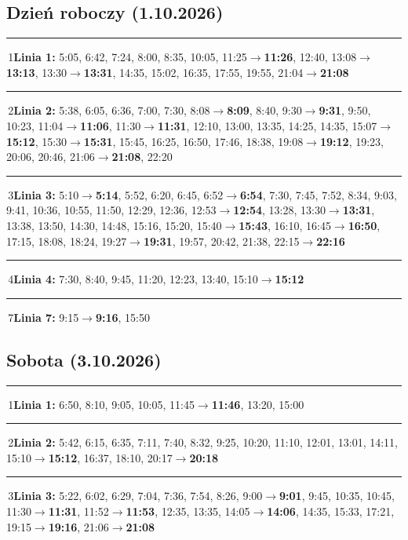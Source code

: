 \documentclass[10pt,a4paper]{article}
\newcommand{\linedot}[1]{\textcolor{#1}{\rule[0.1ex]{0.9ex}{0.9ex}}\,}
\begin{document}
\subsection*{Dzień roboczy (1.10.2026)}
{\footnotesize
\noindent\linedot{L1}1\textbf{Linia 1:} 5:05, 6:42, 7:24, 8:00, 8:35, 10:05, 11:25$\to$\textbf{11:26}, 12:40, 13:08$\to$\textbf{13:13}, 13:30$\to$\textbf{13:31}, 14:35, 15:02, 16:35, 17:55, 19:55, 21:04$\to$\textbf{21:08}\par\smallskip
\noindent\linedot{L2}2\textbf{Linia 2:} 5:38, 6:05, 6:36, 7:00, 7:30, 8:08$\to$\textbf{8:09}, 8:40, 9:30$\to$\textbf{9:31}, 9:50, 10:23, 11:04$\to$\textbf{11:06}, 11:30$\to$\textbf{11:31}, 12:10, 13:00, 13:35, 14:25, 14:35, 15:07$\to$\textbf{15:12}, 15:30$\to$\textbf{15:31}, 15:45, 16:25, 16:50, 17:46, 18:38, 19:08$\to$\textbf{19:12}, 19:23, 20:06, 20:46, 21:06$\to$\textbf{21:08}, 22:20\par\smallskip
\noindent\linedot{L3}3\textbf{Linia 3:} 5:10$\to$\textbf{5:14}, 5:52, 6:20, 6:45, 6:52$\to$\textbf{6:54}, 7:30, 7:45, 7:52, 8:34, 9:03, 9:41, 10:36, 10:55, 11:50, 12:29, 12:36, 12:53$\to$\textbf{12:54}, 13:28, 13:30$\to$\textbf{13:31}, 13:38, 13:50, 14:30, 14:48, 15:16, 15:20, 15:40$\to$\textbf{15:43}, 16:10, 16:45$\to$\textbf{16:50}, 17:15, 18:08, 18:24, 19:27$\to$\textbf{19:31}, 19:57, 20:42, 21:38, 22:15$\to$\textbf{22:16}\par\smallskip
\noindent\linedot{L4}4\textbf{Linia 4:} 7:30, 8:40, 9:45, 11:20, 12:23, 13:40, 15:10$\to$\textbf{15:12}\par\smallskip
\noindent\linedot{L7}7\textbf{Linia 7:} 9:15$\to$\textbf{9:16}, 15:50\par\smallskip
}
\subsection*{Sobota (3.10.2026)}
{\footnotesize
\noindent\linedot{L1}1\textbf{Linia 1:} 6:50, 8:10, 9:05, 10:05, 11:45$\to$\textbf{11:46}, 13:20, 15:00\par\smallskip
\noindent\linedot{L2}2\textbf{Linia 2:} 5:42, 6:15, 6:35, 7:11, 7:40, 8:32, 9:25, 10:20, 11:10, 12:01, 13:01, 14:11, 15:10$\to$\textbf{15:12}, 16:37, 18:10, 20:17$\to$\textbf{20:18}\par\smallskip
\noindent\linedot{L3}3\textbf{Linia 3:} 5:22, 6:02, 6:29, 7:04, 7:36, 7:54, 8:26, 9:00$\to$\textbf{9:01}, 9:45, 10:35, 10:45, 11:30$\to$\textbf{11:31}, 11:52$\to$\textbf{11:53}, 12:35, 13:35, 14:05$\to$\textbf{14:06}, 14:35, 15:33, 17:21, 19:15$\to$\textbf{19:16}, 21:06$\to$\textbf{21:08}\par\smallskip
}
\end{document}
